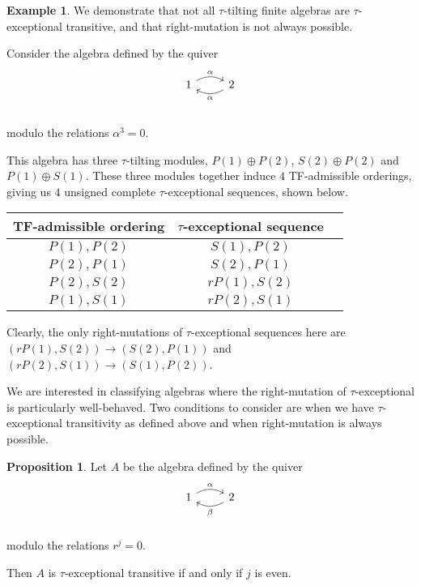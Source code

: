 \documentclass[]{article}
\theoremstyle{definition}
\newtheorem{proposition}{Proposition}[section]
\newtheorem{example}{Example}[section]
\newcommand{\tu}{\ensuremath{\tau}}
\begin{document}
\begin{example}
	We demonstrate that not all \tu-tilting finite algebras are \tu-exceptional transitive, and that right-mutation is not always possible.
	
	Consider the algebra defined by the quiver
	\[
	\begin{tikzcd}
	1 \arrow[r,bend left,"\alpha"] & 2 \arrow[l,bend left,"\alpha"]  \\
	\end{tikzcd}
	\]
	
	modulo the relations $\alpha^3 = 0$.
	
	This algebra has three $\tau$-tilting modules, $P(1) \oplus P(2)$, $S(2) \oplus P(2)$ and $P(1) \oplus S(1)$. These three modules together induce $4$ TF-admissible orderings, giving us $4$ unsigned complete \tu-exceptional sequences, shown below.
	
	\begin{center}
		\begin{tabular}{ |c|c|c| } 
			\hline
			TF-admissible ordering & $\tau$-exceptional sequence \\
			\hline
			$P(1),P(2)$ & $S(1),P(2)$ \\ 
			$P(2),P(1)$ & $S(2),P(1)$ \\ 
			$P(2),S(2)$ & $rP(1),S(2)$\\ 
			$P(1),S(1)$ & $rP(2),S(1)$ \\
			\hline
		\end{tabular}
	\end{center}

	
	
	Clearly, the only right-mutations of $\tau$-exceptional sequences here are $(rP(1),S(2)) \to (S(2),P(1))$ and $(rP(2),S(1)) \to (S(1),P(2))$. 
\end{example}

We are interested in classifying algebras where the right-mutation of \tu-exceptional is particularly well-behaved. Two conditions to consider are when we have \tu-exceptional transitivity as defined above and when right-mutation is always possible.

\begin{proposition}
	Let $A$ be the algebra defined by the quiver
	\[
	\begin{tikzcd}
	1 \arrow[r,bend left,"\alpha"] & 2 \arrow[l,bend left,"\beta"]  \\
	\end{tikzcd}
	\]
	
	modulo the relations $r^j = 0$.
	
	Then $A$ is \tu-exceptional transitive if and only if $j$ is even.
\end{proposition}
\end{document}
